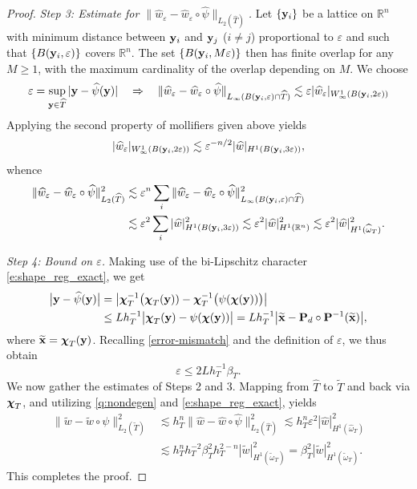 \begin{proof}
\medskip\noindent
{\it Step 3: Estimate for
$\|\widehat{w}_\varepsilon-\widehat{w}_\varepsilon \circ \widehat{\psi}\|_{L_2(\widehat{T})}$.}
Let $\{{\bf y}_i\}$ be a lattice on $\mathbb{R}^n$ with minimum distance between ${\bf y}_i$ and ${\bf y}_j$ ($i \neq j$) proportional to $\varepsilon$ and such that $\{B({\bf y}_i,\varepsilon)\}$ covers $\mathbb{R}^n$.  The set $\{B({\bf y}_i,M\varepsilon)\}$ then has finite overlap for any $M\ge1$, with the maximum cardinality of the overlap depending on $M$. We choose
%
\[
\varepsilon = \sup_{{\bf y}\in\widehat{T}} |{\bf y} - \widehat\psi({\bf y})|
\quad\Rightarrow\quad
\|\widehat{w}_\varepsilon-\widehat{w}_\varepsilon \circ \widehat{\psi}\|_{L_\infty(B({\bf y}_i,\varepsilon)\cap\widehat{T})}
 \lesssim \varepsilon |\widehat{w}_\varepsilon|_{W_\infty^1(B({\bf y}_i,2\varepsilon))}
\]
%
Applying the second property of mollifiers given above yields
\[
|\widehat{w}_\varepsilon|_{W_\infty^1(B({\bf y}_i,2\varepsilon))} \lesssim
\varepsilon^{-n/2} |\widehat{w}|_{H^1(B({\bf y}_i,3\varepsilon))},
\]
%
whence
%
\begin{align*}
  \|\widehat{w}_\varepsilon  -\widehat{w}_\varepsilon \circ \widehat{\psi}\|_{L_2(\widehat{T})}^2  &\lesssim \varepsilon^{n} \sum_{i} \|\widehat{w}_\varepsilon-\widehat{w}_\varepsilon \circ \widehat{\psi}\|_{L_\infty(B({\bf y}_i,\varepsilon) \cap \widehat{T})}^2
\\  
& \lesssim \varepsilon^2 \sum_{i} |\widehat{w}|_{H^1(B({\bf y}_i,3\varepsilon))}^2
 \lesssim \varepsilon^2 |\widehat{w} |_{H^1(\mathbb{R}^n)}^2
\lesssim \varepsilon^2 |\widehat{w}|_{H^1(\widehat{\omega}_T)}^2.
\end{align*}

\medskip\noindent
{\it Step 4: Bound on $\varepsilon$.}
Making use of the bi-Lipschitz character \eqref{e:shape_reg_exact}, we get
%
\begin{align*}
  \big| {\bf y} - \widehat\psi ({\bf y}) \big| & =
  \big|{\boldsymbol \chi}_T^{-1} \big({\boldsymbol \chi}_T({\bf y})) - {\boldsymbol \chi}_T^{-1}\big(\psi({\boldsymbol \chi}({\bf y}))\big) \big|
  \\
  & \le L h_T^{-1} \big| {\boldsymbol \chi}_T({\bf y}) -  \psi({\boldsymbol \chi}({\bf y})) \big|
  = L h_T^{-1} \big| \widetilde{{\bf x}} - {\bf P}_d\circ{\bf P}^{-1}( \widetilde{{\bf x}} ) \big|,
\end{align*}
%
where $\widetilde{{\bf x}} = {\boldsymbol \chi}_T({\bf y})$.
Recalling \eqref{error-mismatch} and the definition of $\varepsilon$, we thus obtain
%
\[
\varepsilon \le 2L h_T^{-1} \beta_T.
\]
%
We now gather the estimates of Steps 2 and 3.
Mapping from $\widehat{T}$ to $\widetilde{T}$ and back via ${\boldsymbol \chi}_T$, and utilizing
\eqref{q:nondegen} and \eqref{e:shape_reg_exact}, yields
%
\begin{align*}
  \|\widetilde{w}-\widetilde{w} \circ \psi \|_{L_2(\widetilde{T})}^2
  &\lesssim h_T^n \|\widehat{w}-\widehat{w} \circ \widehat{\psi}\|_{L_2(\widehat{T})}^2
  \lesssim h_T^n \varepsilon^2 |\widehat{w}|_{H^1(\widehat{\omega}_T)}^2 
\\ & \lesssim h_T^n h_T^{-2} \beta_T^2 h_T^{2-n} |\widetilde{w}|_{H^1(\widetilde{\omega}_T)}^2 =\beta_T^2 |\widetilde{w}|_{H^1(\widetilde{\omega}_T)}^2.  
\end{align*}
%
This completes the proof.
\end{proof}

